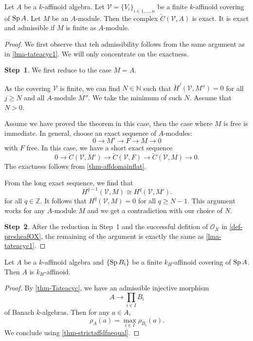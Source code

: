 \begin{thm}\label{thm-Tateacyc}
    Let $A$ be a $k$-affinoid algebra. Let $\mathcal{V}=\{V_i\}_{i\in 1,\ldots,n}$ be a finite $k$-affinoid covering of $\operatorname{Sp} A$. Let $M$ be an $A$-module.
    Then the complex $\check{C}(\mathcal{V},A)$ is exact. It is exact and admissible if $M$ is finite as $A$-module.
\end{thm}
\begin{proof}
    We first observe that teh admissibility follows from the same argument as in \cref{lma-tateacyc1}. We will only concentrate on the exactness. 

    \textbf{Step~1}. We first reduce to the case $M=A$. 


    As the covering $\mathcal{V}$ is finite, we can find $N\in \mathbb{N}$ such that $\check{H}^j(\mathcal{V},M'')=0$ for all $j\geq N$ and all $A$-module $M''$. We take the minimum of such $N$. Assume that $N> 0$.

    Assume we have proved the theorem in this case, then the case where $M$ is free is immediate. In general, choose an exact sequence of $A$-modules:
    \[
        0\rightarrow M'\rightarrow F\rightarrow M\rightarrow 0  
    \]
    with $F$ free. In this case, we have a short exact sequence
    \[
        0\rightarrow  \check{C}(\mathcal{V},M')\rightarrow \check{C}(\mathcal{V},F)\rightarrow \check{C}(\mathcal{V},M)\rightarrow 0. 
    \]
    The exactness follows from \cref{thm-affdomainflat}. 

    From the long exact sequence, we find that
    \[
        H^{q-1}(\mathcal{V},M)\cong   H^{q}(\mathcal{V},M').
    \]
    for all $q\in \mathbb{Z}$. It follows that $H^q(\mathcal{V},M)=0$ for all $q\geq N-1$. This argument works for any $A$-module $M$ and we get a contradiction with our choice of $N$.

    \textbf{Step~2}. After the reduction in Step~1 and the successful defition of $\mathcal{O}_X$ in \cref{def-presheafOX}, the remaining of the argument is exactly the same as \cref{lma-tateacyc1}.
\end{proof}

\begin{corollary}\label{cor-coveringkhimplykh}
    Let $A$ be a $k$-affinoid algebra and $\{\operatorname{Sp} B_i\}$ be a finite $k_H$-affinoid covering of $\operatorname{Sp} A$. Then $A$ is $k_H$-affinoid.
\end{corollary}
\begin{proof}
    By \cref{thm-Tateacyc}, we have an admissible injective morphism
    \[
        A\rightarrow   \prod_{i\in I}B_i
    \]
    of Banach $k$-algebras. Then for any $a\in A$, 
    \[
        \rho_A(a)=\max_{i\in I}\rho_{B_i}(a).
    \]
    We conclude using \cref{thm-strictaffdfnequal}.
\end{proof}

